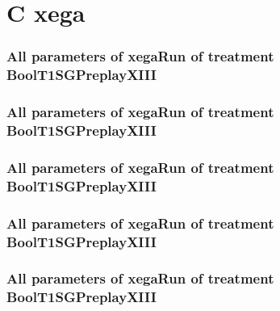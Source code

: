 \documentclass[18pt,c]{beamer}
\makeatletter
\let\beamer@writeslidentry@miniframeson=\beamer@writeslidentry
\newcommand*{\miniframeson}{\let\beamer@writeslidentry=\beamer@writeslidentry@miniframeson}
\makeatother
\begin{document}
\miniframeson
\section{C xega}

 \begin{frame}
 \fontsize{8pt}{9pt}\selectfont
 \frametitle{  All parameters of xegaRun of treatment BoolT1SGPreplayXIII 
 }

 \label{ExpCtParmTable016.tex}  
 \end{frame}


 \begin{frame}
 \fontsize{8pt}{9pt}\selectfont
 \frametitle{  All parameters of xegaRun of treatment BoolT1SGPreplayXIII 
 }

 \label{ExpCtParmTable017.tex}  
 \end{frame}


 \begin{frame}
 \fontsize{8pt}{9pt}\selectfont
 \frametitle{  All parameters of xegaRun of treatment BoolT1SGPreplayXIII 
 }

 \label{ExpCtParmTable018.tex}  
 \end{frame}


 \begin{frame}
 \fontsize{8pt}{9pt}\selectfont
 \frametitle{  All parameters of xegaRun of treatment BoolT1SGPreplayXIII 
 }

 \label{ExpCtParmTable019.tex}  
 \end{frame}


 \begin{frame}
 \fontsize{8pt}{9pt}\selectfont
 \frametitle{  All parameters of xegaRun of treatment BoolT1SGPreplayXIII 
 }

 \label{ExpCtParmTable020.tex}  
 \end{frame}
\end{document}
